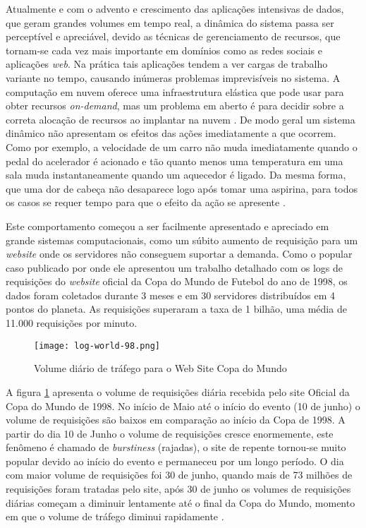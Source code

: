 Atualmente e com o advento e crescimento das aplicações intensivas de dados, que geram grandes volumes em tempo real, a dinâmica do sistema passa ser perceptível e apreciável, devido as técnicas de gerenciamento de recursos, que tornam-se cada vez mais importante em domínios como as redes sociais e aplicações \textit{web}. Na prática tais aplicações tendem a ver cargas de trabalho variante no tempo, causando inúmeras problemas imprevisíveis no sistema. A computação em nuvem oferece uma infraestrutura elástica que pode usar para obter recursos \textit{on-demand}, mas um problema em aberto é para decidir sobre a correta alocação de recursos ao implantar na nuvem \cite{Cervino2012}. De modo geral um sistema dinâmico não apresentam os efeitos das ações imediatamente a que ocorrem. Como por exemplo, a velocidade de um carro não muda imediatamente quando o pedal do acelerador é acionado e tão quanto menos uma temperatura em uma sala muda instantaneamente quando um aquecedor é ligado. Da mesma forma, que uma dor de cabeça não desaparece logo após tomar uma aspirina, para todos os casos se requer tempo para que o efeito da ação se apresente \cite{Karl2008}.

Este comportamento começou a ser facilmente apresentado e apreciado em grande sistemas computacionais, como um súbito aumento de requisição para um \textit{website} onde os servidores não conseguem suportar a demanda. Como o popular caso publicado por \cite{Arlitt2000} onde ele apresentou um trabalho detalhado com os logs de requisições do \textit{website} oficial da Copa do Mundo de Futebol do ano de 1998, os dados foram coletados durante 3 meses e em 30 servidores distribuídos em 4 pontos do planeta. As requisições superaram a taxa de 1 bilhão, uma média de 11.000 requisições por minuto.

\begin{figure}[htb]
	\caption{Volume diário de tráfego para o Web Site Copa do Mundo}
	\label{fig:log98}
	\centering
	\texttt{[image: log-world-98.png]}
\end{figure}

A figura \ref{fig:log98} apresenta o volume de requisições diária recebida pelo site Oficial da Copa do Mundo de 1998. No início de Maio até o início do evento (10 de junho) o volume de requisições são baixos em comparação ao início da Copa de 1998. A partir do dia 10 de Junho o volume de requisições cresce enormemente, este fenômeno é chamado de \textit{burstiness} (rajadas), o site de repente tornou-se muito popular devido ao início do evento e permaneceu por um longo período. O dia com maior volume de requisições foi 30 de junho, quando mais de 73 milhões de requisições foram tratadas pelo site, após 30 de junho os volumes de requisições diárias começam a diminuir lentamente até o final da Copa do Mundo, momento em que o volume de tráfego diminui rapidamente \cite{Arlitt2000}.

